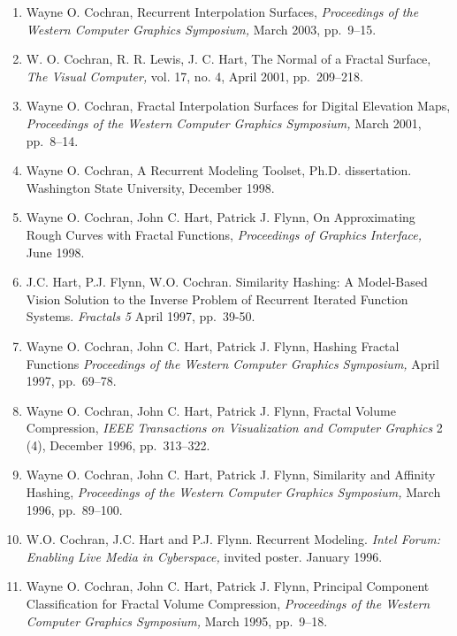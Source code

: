 \documentclass[12pt]{article}
\begin{document}
\begin{enumerate}

\item Wayne O. Cochran,
Recurrent Interpolation Surfaces,
{\em Proceedings of the Western Computer Graphics Symposium,}
March 2003, pp.~9--15.

\item W. O. Cochran, R. R. Lewis, J. C. Hart,
The Normal of a Fractal Surface,
{\em The Visual Computer,} vol. 17, no. 4, April 2001, pp.~209--218.

\item Wayne O. Cochran,
Fractal Interpolation Surfaces for Digital Elevation Maps,
{\em Proceedings of the Western Computer Graphics Symposium,}
March 2001, pp.~8--14.

\item Wayne O. Cochran,
A Recurrent Modeling Toolset, Ph.D. dissertation.
Washington State University, December 1998.

\item
Wayne O. Cochran, John C. Hart, Patrick J. Flynn,
On Approximating Rough Curves with Fractal Functions,
{\em Proceedings of Graphics Interface,}
June 1998.

\item
J.C. Hart, P.J. Flynn, W.O. Cochran. 
Similarity Hashing: A Model-Based Vision Solution to the Inverse 
Problem of Recurrent Iterated Function Systems. 
{\em Fractals 5} April 1997, pp.~39-50.

\item
Wayne O. Cochran, John C. Hart, Patrick J. Flynn,
Hashing Fractal Functions
{\em Proceedings of the Western Computer Graphics Symposium,}
April 1997, pp.~69--78.

\item
Wayne O. Cochran, John C. Hart, Patrick J. Flynn,
Fractal Volume Compression,
{\em IEEE Transactions on Visualization and Computer Graphics}
2 (4),
December 1996, pp.~313--322.

\item
Wayne O. Cochran, John C. Hart, Patrick J. Flynn,
Similarity and Affinity Hashing,
{\em Proceedings of the Western Computer Graphics Symposium,}
March 1996, pp.~89--100.

\item
W.O. Cochran, J.C. Hart and P.J. Flynn. Recurrent Modeling. 
{\em Intel Forum: Enabling Live Media in Cyberspace,} 
invited poster. January 1996.

\item
Wayne O. Cochran, John C. Hart, Patrick J. Flynn,
Principal Component Classification for Fractal Volume Compression,
{\em Proceedings of the Western Computer Graphics Symposium,}
March 1995, \mbox{pp.~9--18}.

\end{enumerate}
\end{document}
